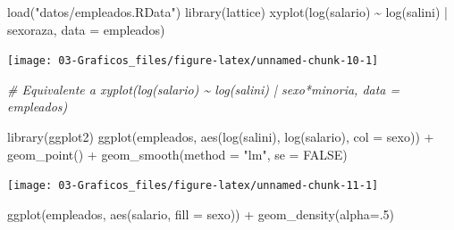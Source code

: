 \documentclass[
]{book}
\newenvironment{Shaded}{\begin{snugshade}}{\end{snugshade}}
\newcommand{\AttributeTok}[1]{\textcolor[rgb]{0.77,0.63,0.00}{#1}}
\newcommand{\CommentTok}[1]{\textcolor[rgb]{0.56,0.35,0.01}{\textit{#1}}}
\newcommand{\ConstantTok}[1]{\textcolor[rgb]{0.00,0.00,0.00}{#1}}
\newcommand{\DecValTok}[1]{\textcolor[rgb]{0.00,0.00,0.81}{#1}}
\newcommand{\FunctionTok}[1]{\textcolor[rgb]{0.00,0.00,0.00}{#1}}
\newcommand{\NormalTok}[1]{#1}
\newcommand{\SpecialCharTok}[1]{\textcolor[rgb]{0.00,0.00,0.00}{#1}}
\newcommand{\StringTok}[1]{\textcolor[rgb]{0.31,0.60,0.02}{#1}}
\theoremstyle{break}
\begin{document}
\begin{Shaded}
\begin{Highlighting}[]
\FunctionTok{load}\NormalTok{(}\StringTok{"datos/empleados.RData"}\NormalTok{)}
\FunctionTok{library}\NormalTok{(lattice)}
\FunctionTok{xyplot}\NormalTok{(}\FunctionTok{log}\NormalTok{(salario) }\SpecialCharTok{\textasciitilde{}} \FunctionTok{log}\NormalTok{(salini) }\SpecialCharTok{|}\NormalTok{ sexoraza, }\AttributeTok{data =}\NormalTok{ empleados)}
\end{Highlighting}
\end{Shaded}

\begin{center}\texttt{[image: 03-Graficos\_files/figure-latex/unnamed-chunk-10-1]} \end{center}

\begin{Shaded}
\begin{Highlighting}[]
\CommentTok{\# Equivalente a xyplot(log(salario) \textasciitilde{} log(salini) | sexo*minoria, data = empleados)}
\end{Highlighting}
\end{Shaded}

\begin{Shaded}
\begin{Highlighting}[]
\FunctionTok{library}\NormalTok{(ggplot2)}
\FunctionTok{ggplot}\NormalTok{(empleados, }\FunctionTok{aes}\NormalTok{(}\FunctionTok{log}\NormalTok{(salini), }\FunctionTok{log}\NormalTok{(salario), }\AttributeTok{col =}\NormalTok{ sexo)) }\SpecialCharTok{+}
  \FunctionTok{geom\_point}\NormalTok{() }\SpecialCharTok{+}
  \FunctionTok{geom\_smooth}\NormalTok{(}\AttributeTok{method =} \StringTok{"lm"}\NormalTok{, }\AttributeTok{se =} \ConstantTok{FALSE}\NormalTok{)}
\end{Highlighting}
\end{Shaded}

\begin{center}\texttt{[image: 03-Graficos\_files/figure-latex/unnamed-chunk-11-1]} \end{center}

\begin{Shaded}
\begin{Highlighting}[]
\FunctionTok{ggplot}\NormalTok{(empleados, }\FunctionTok{aes}\NormalTok{(salario, }\AttributeTok{fill =}\NormalTok{ sexo)) }\SpecialCharTok{+}
  \FunctionTok{geom\_density}\NormalTok{(}\AttributeTok{alpha=}\NormalTok{.}\DecValTok{5}\NormalTok{)}
\end{Highlighting}
\end{Shaded}
\end{document}
